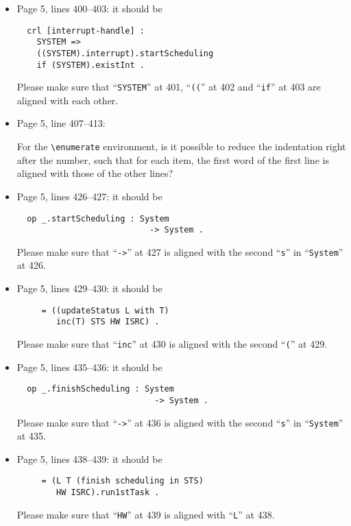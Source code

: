 \documentclass[12pt,onecolumn]{IEEEtranTIE}
\begin{document}
\begin{itemize}
\item Page 5, lines 400--403: it should be
\begin{verbatim}
  crl [interrupt-handle] :
    SYSTEM =>  
    ((SYSTEM).interrupt).startScheduling
    if (SYSTEM).existInt .
\end{verbatim}

Please make sure that ``\verb|SYSTEM|'' at 401, ``\verb|((|'' at 402
and ``\verb|if|'' at 403 are aligned with each other.


\item Page 5, line 407--413:

For the \verb|\enumerate| environment, is it possible to reduce the
indentation right after the number, such that for each item, the first
word of the first line is aligned with those of the other lines? 


\item Page 5, lines 426--427: it should be
\begin{verbatim}
  op _.startScheduling : System 
                           -> System .
\end{verbatim}

Please make sure that ``\verb|->|'' at 427 is aligned with the second
``\verb|s|'' in ``\verb|System|'' at 426.


\item Page 5, lines 429--430: it should be
\begin{verbatim}
     = ((updateStatus L with T) 
        inc(T) STS HW ISRC) .
\end{verbatim}

Please make sure that ``\verb|inc|'' at 430 is aligned with the second
``\verb|(|'' at 429.


\item Page 5, lines 435--436: it should be
\begin{verbatim}
  op _.finishScheduling : System 
                            -> System .
\end{verbatim}

Please make sure that ``\verb|->|'' at 436 is aligned with the second
``\verb|s|'' in ``\verb|System|'' at 435.


\item Page 5, lines 438--439: it should be
\begin{verbatim}
     = (L T (finish scheduling in STS) 
        HW ISRC).run1stTask .
\end{verbatim}

Please make sure that ``\verb|HW|'' at 439 is aligned with
``\verb|L|'' at 438.



\end{itemize}
\end{document}
